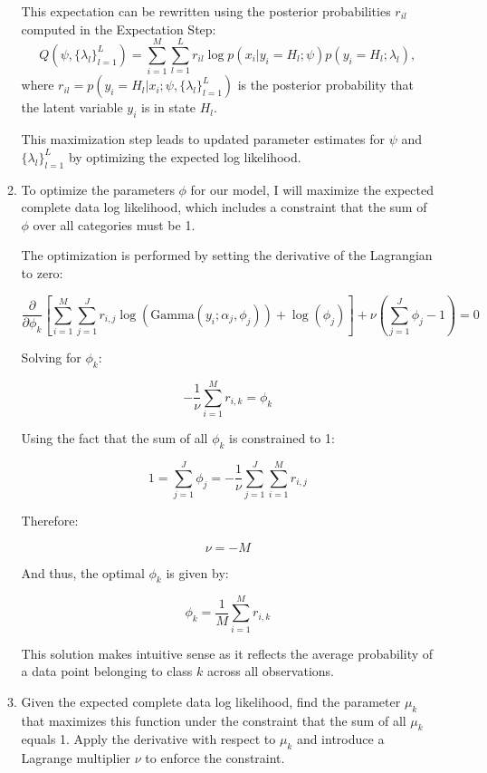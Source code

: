 \documentclass[submit]{harvardml}
\begin{document}
\begin{enumerate}
\begin{enumerate}
This expectation can be rewritten using the posterior probabilities \( r_{il} \) computed in the Expectation Step:
\begin{equation}
    Q(\psi, \{\lambda_l\}_{l=1}^L) = \sum_{i=1}^M \sum_{l=1}^L r_{il} \log p(x_i | y_i = H_l; \psi) p(y_i = H_l; \lambda_l),
\end{equation}
where \( r_{il} = p(y_i = H_l | x_i; \psi, \{\lambda_l\}_{l=1}^L) \) is the posterior probability that the latent variable \( y_i \) is in state \( H_l \).

This maximization step leads to updated parameter estimates for \( \psi \) and \( \{\lambda_l\}_{l=1}^L \) by optimizing the expected log likelihood.
      \item To optimize the parameters \( \phi \) for our model, I will maximize the expected complete data log likelihood, which includes a constraint that the sum of \( \phi \) over all categories must be 1.

The optimization is performed by setting the derivative of the Lagrangian to zero:

\begin{equation}
    \frac{\partial}{\partial \phi_k} \left[ \sum_{i=1}^M \sum_{j=1}^J r_{i,j} \log(\text{Gamma}(y_i; \alpha_j, \phi_j)) + \log(\phi_j) \right] + \nu \left( \sum_{j=1}^J \phi_j - 1 \right) = 0
\end{equation}

Solving for \( \phi_k \):

\begin{equation}
    -\frac{1}{\nu} \sum_{i=1}^M r_{i,k} = \phi_k
\end{equation}

Using the fact that the sum of all \( \phi_k \) is constrained to 1:

\begin{equation}
    1 = \sum_{j=1}^J \phi_j = -\frac{1}{\nu} \sum_{j=1}^J \sum_{i=1}^M r_{i,j}
\end{equation}

Therefore:

\begin{equation}
    \nu = -M
\end{equation}

And thus, the optimal \( \phi_k \) is given by:

\begin{equation}
    \phi_k = \frac{1}{M} \sum_{i=1}^M r_{i,k}
\end{equation}

This solution makes intuitive sense as it reflects the average probability of a data point belonging to class \( k \) across all observations.
      \item Given the expected complete data log likelihood, find the parameter \( \mu_k \) that maximizes this function under the constraint that the sum of all \( \mu_k \) equals 1. Apply the derivative with respect to \( \mu_k \) and introduce a Lagrange multiplier \( \nu \) to enforce the constraint.


\end{enumerate}
\end{enumerate}
\end{document}
